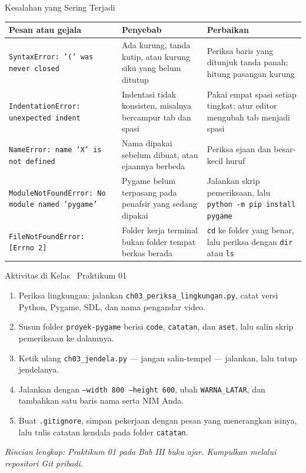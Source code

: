 \documentclass[aspectratio=169,10pt]{beamer}
\begin{document}
\begin{frame}{Kesalahan yang Sering Terjadi}
{\scriptsize
\renewcommand{\arraystretch}{1.18}
\begin{tabularx}{\textwidth}{@{}>{\raggedright\arraybackslash}p{4.4cm}
    >{\raggedright\arraybackslash}p{3.6cm}
    >{\raggedright\arraybackslash}X@{}}
\toprule
\textbf{Pesan atau gejala} & \textbf{Penyebab} & \textbf{Perbaikan} \\
\midrule
\texttt{SyntaxError: '(' was never closed} &
  Ada kurung, tanda kutip, atau kurung siku yang belum ditutup &
  Periksa baris yang ditunjuk tanda panah; hitung pasangan kurung \\
\texttt{IndentationError: unexpected indent} &
  Indentasi tidak konsisten, misalnya bercampur tab dan spasi &
  Pakai empat spasi setiap tingkat; atur editor mengubah tab menjadi spasi \\
\texttt{NameError: name 'X' is not defined} &
  Nama dipakai sebelum dibuat, atau ejaannya berbeda &
  Periksa ejaan dan besar-kecil huruf \\
\texttt{ModuleNotFoundError: No module named 'pygame'} &
  Pygame belum terpasang pada penafsir yang sedang dipakai &
  Jalankan skrip pemeriksaan, lalu \texttt{python -m pip install pygame} \\
\texttt{FileNotFoundError: [Errno 2]} &
  Folder kerja terminal bukan folder tempat berkas berada &
  \texttt{cd} ke folder yang benar, lalu periksa dengan \texttt{dir} atau
  \texttt{ls} \\
\bottomrule
\end{tabularx}}
\end{frame}

\begin{frame}{Aktivitas di Kelas \textperiodcentered\ Praktikum 01}
\begin{enumerate}
  \item Periksa lingkungan: jalankan \texttt{ch03\_periksa\_lingkungan.py},
        catat versi Python, Pygame, SDL, dan nama pengandar video.
  \item Susun folder \texttt{proyek-pygame} berisi \texttt{code},
        \texttt{catatan}, dan \texttt{aset}, lalu salin skrip pemeriksaan ke
        dalamnya.
  \item Ketik ulang \texttt{ch03\_jendela.py} --- jangan salin-tempel ---
        jalankan, lalu tutup jendelanya.
  \item Jalankan dengan \texttt{--width 800 --height 600}, ubah
        \texttt{WARNA\_LATAR}, dan tambahkan satu baris nama serta NIM Anda.
  \item Buat \texttt{.gitignore}, simpan pekerjaan dengan pesan yang menerangkan
        isinya, lalu tulis catatan kendala pada folder \texttt{catatan}.
\end{enumerate}
\vspace{0.12cm}
{\footnotesize\color{ubAccent}\itshape Rincian lengkap: Praktikum 01 pada Bab III
buku ajar. Kumpulkan melalui repositori Git pribadi.}
\end{frame}
\end{document}
